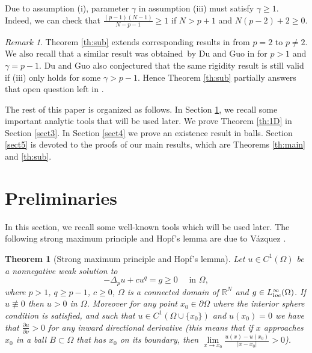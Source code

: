 \documentclass[reqno]{amsart}
\theoremstyle{plain}
\newtheorem{theorem}{Theorem}
\theoremstyle{definition}
\theoremstyle{remark}
\newtheorem{remark}{Remark}
\begin{document}
	Due to assumption (i), parameter $\gamma$ in assumption (iii) must satisfy $\gamma\ge1$. Indeed, we can check that $\frac{(p-1)(N-1)}{N-p-1}\ge1$ if $N>p+1$ and $N(p-2)+2\ge0$.
	
	\begin{remark}
		Theorem \ref{th:sub} extends corresponding results in \cite{MR1470317,MR2002396} from $p=2$ to $p\ne2$. We also recall that a similar result was obtained by Du and Guo in \cite{MR2056284} for $p>1$ and $\gamma=p-1$. Du and Guo also conjectured that the same rigidity result is still valid if (iii) only holds for some $\gamma>p-1$. Hence Theorem \ref{th:sub} partially answers that open question left in \cite{MR2056284}.
	\end{remark}
	
	The rest of this paper is organized as follows. In Section \ref{sect2}, we recall some important analytic tools that will be used later. We prove Theorem \ref{th:1D} in Section \ref{sect3}. In Section \ref{sect4} we prove an existence result in balls. Section \ref{sect5} is devoted to the proofs of our main results, which are Theorems \ref{th:main} and \ref{th:sub}.
	
	\section{Preliminaries}\label{sect2}
	In this section, we recall some well-known tools which will be used later.
	The following strong maximum principle and Hopf's lemma are due to V\'{a}zquez \cite{MR768629}.
	\begin{theorem}[Strong maximum principle and Hopf's lemma]\label{th:smp}
		Let $u\in C^1(\Omega)$ be a nonnegative weak solution to
		\[
		-\Delta_p u + cu^q = g \ge 0 \quad\text{ in }\Omega,
		\]
		where $p>1$, $q\ge p-1$, $c\ge0$, $\Omega$ is a connected domain of $\mathbb{R}^N$ and $g \in L^\infty_{\rm loc}(\Omega)$. If $u \not\equiv 0$ then $u > 0$ in $\Omega$. Moreover for any point $x_0 \in \partial \Omega$ where the interior sphere condition is satisfied, and such that $u\in C^1(\Omega\cup\{x_0\})$ and $u(x_0) = 0$ we have that $\frac{\partial u}{\partial \nu}>0$ for any inward directional
		derivative (this means that if $x$ approaches $x_0$ in a ball $B\subset\Omega$
		that has $x_0$ on its boundary, then $\lim\limits_{x\to x_0} \frac{u(x)-u(x_0)}{|x-x_0|}>0$).
	\end{theorem}
	
\end{document}
